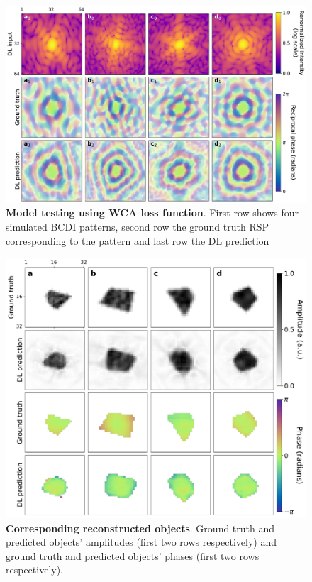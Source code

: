 \begin{figure}[H]
    \centering
    \includegraphics[width=.8\textwidth]{figures/Phasing/RSP_low_strain_VFN.pdf}
    \caption{\textbf{Model testing using WCA loss function}. First row shows four simulated BCDI patterns, second row the ground truth RSP 
    corresponding to the pattern and last row the DL prediction }
    \label{fig:RSP_vfn}
\end{figure}
\begin{figure}[H]
    \centering
    \includegraphics[width=.8\textwidth]{figures/Phasing/obj_low_strain_VFN.pdf}
    \caption{\textbf{Corresponding reconstructed objects}. Ground truth and predicted objects' amplitudes (first two rows 
    respectively) and ground truth and predicted objects' phases (first two rows respectively). }
    \label{fig:obj_vfn}
\end{figure}

